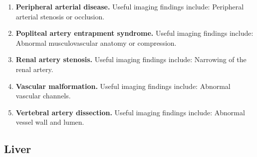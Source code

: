 \begin{enumerate}[leftmargin=*,itemsep=0.45em,topsep=0.4em]
\item \textbf{Peripheral arterial disease.} Useful imaging findings include: Peripheral arterial stenosis or occlusion.
\item \textbf{Popliteal artery entrapment syndrome.} Useful imaging findings include: Abnormal musculovascular anatomy or compression.
\item \textbf{Renal artery stenosis.} Useful imaging findings include: Narrowing of the renal artery.
\item \textbf{Vascular malformation.} Useful imaging findings include: Abnormal vascular channels.
\item \textbf{Vertebral artery dissection.} Useful imaging findings include: Abnormal vessel wall and lumen.
\end{enumerate}

\subsection{Liver}
